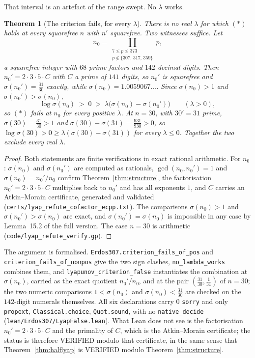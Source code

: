 \documentclass[11pt]{article}
\newtheorem{theorem}{Theorem}[section]
\theoremstyle{definition}
\begin{document}
That interval is an artefact of the range swept. No $\lambda$ works.

\begin{theorem}[The criterion fails, for every $\lambda$]\label{thm:lyapfalse}
There is no real $\lambda$ for which $(\ast)$ holds at every squarefree $n$ with $n'$ squarefree.
Two witnesses suffice. Let
\[ n_0=\!\!\!\prod_{\substack{7\le p\le373\\ p\notin\{307,\,317,\,359\}}}\!\!\!p, \]
a squarefree integer with $68$ prime factors and $142$ decimal digits. Then $n_0'=2\cdot3\cdot5\cdot C$
with $C$ a prime of $141$ digits, so $n_0'$ is squarefree and $\sigma(n_0')=\tfrac{31}{30}$ exactly,
while $\sigma(n_0)=1.0059067\ldots$. Since $\sigma(n_0)>1$ and $\sigma(n_0')>\sigma(n_0)$,
\[ \log\sigma(n_0)\;>\;0\;>\;\lambda\bigl(\sigma(n_0)-\sigma(n_0')\bigr)\qquad(\lambda>0), \]
so $(\ast)$ fails at $n_0$ for every positive $\lambda$. At $n=30$, with $30'=31$ prime,
$\sigma(30)=\tfrac{31}{30}>1$ and $\sigma(30)-\sigma(31)=\tfrac{931}{930}>0$, so $\log\sigma(30)>0\ge
\lambda(\sigma(30)-\sigma(31))$ for every $\lambda\le0$. Together the two exclude every real
$\lambda$.
\end{theorem}
\begin{proof}
Both statements are finite verifications in exact rational arithmetic. For $n_0$: $\sigma(n_0)$ and
$\sigma(n_0')$ are computed as rationals, $\gcd(n_0,n_0')=1$ and $\sigma(n_0)=n_0'/n_0$ confirm
Theorem~\ref{thm:structure}, the factorisation $n_0'=2\cdot3\cdot5\cdot C$ multiplies back to $n_0'$
and has all exponents $1$, and $C$ carries an Atkin--Morain certificate, generated and validated
\textup{(\texttt{certs/lyap\_refute\_cofactor\_ecpp.txt})}. The comparisons $\sigma(n_0)>1$ and
$\sigma(n_0')>\sigma(n_0)$ are exact, and $\sigma(n_0')=\sigma(n_0)$ is impossible in any case by
Lemma~15.2 of the full version. The case $n=30$ is arithmetic
\textup{(\texttt{code/lyap\_refute\_verify.gp})}.
\end{proof}

The argument is formalised. \texttt{Erdos307.criterion\_fails\_of\_pos} and
\texttt{criterion\_fails\_of\_nonpos} give the two sign clashes,
\texttt{no\_lambda\_works} combines them, and \texttt{lyapunov\_criterion\_false} instantiates the
combination at $\sigma(n_0)$, carried as the exact quotient $n_0'/n_0$, and at the pair
$(\tfrac{31}{30},\tfrac1{31})$ of $n=30$; the two numeric comparisons $1<\sigma(n_0)$ and
$\sigma(n_0)<\tfrac{31}{30}$ are checked on the $142$-digit numerals themselves. All six
declarations carry $0$ \texttt{sorry} and only \texttt{propext}, \texttt{Classical.choice},
\texttt{Quot.sound}, with no \texttt{native\_decide}
\textup{(\texttt{lean/Erdos307/LyapFalse.lean})}. What Lean does not see is the factorisation
$n_0'=2\cdot3\cdot5\cdot C$ and the primality of $C$, which is the Atkin--Morain certificate; the
status is therefore \textup{VERIFIED} modulo that certificate, in the same sense that
Theorem~\ref{thm:halflyap} is \textup{VERIFIED} modulo Theorem~\ref{thm:structure}.
\end{document}
